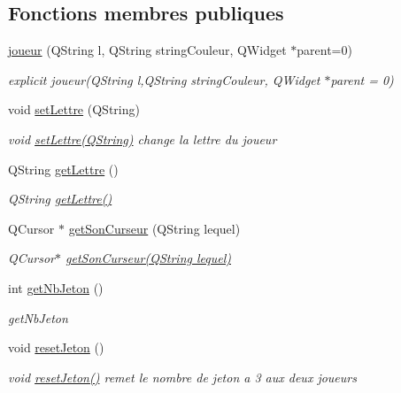 \subsection*{Fonctions membres publiques}
\begin{DoxyCompactItemize}
\item 
\hyperlink{classjoueur_a9f78a65e07011114967ef5c813a868cb}{joueur} (Q\-String l, Q\-String string\-Couleur, Q\-Widget $\ast$parent=0)
\begin{DoxyCompactList}\small\item\em explicit joueur(Q\-String l,Q\-String string\-Couleur, Q\-Widget $\ast$parent = 0) \end{DoxyCompactList}\item 
void \hyperlink{classjoueur_a6095d00e5c84a98694ae3f2ebbef48d8}{set\-Lettre} (Q\-String)
\begin{DoxyCompactList}\small\item\em void \hyperlink{classjoueur_a6095d00e5c84a98694ae3f2ebbef48d8}{set\-Lettre(\-Q\-String)}  change la lettre du joueur \end{DoxyCompactList}\item 
Q\-String \hyperlink{classjoueur_a7a91ed8fa89ad62545bae8e805565c39}{get\-Lettre} ()
\begin{DoxyCompactList}\small\item\em Q\-String \hyperlink{classjoueur_a7a91ed8fa89ad62545bae8e805565c39}{get\-Lettre()} \end{DoxyCompactList}\item 
Q\-Cursor $\ast$ \hyperlink{classjoueur_a19403939c10d9a70b6035024978ca230}{get\-Son\-Curseur} (Q\-String lequel)
\begin{DoxyCompactList}\small\item\em Q\-Cursor$\ast$ \hyperlink{classjoueur_a19403939c10d9a70b6035024978ca230}{get\-Son\-Curseur(\-Q\-String lequel)} \end{DoxyCompactList}\item 
int \hyperlink{classjoueur_a80aefa29f51995d731605b5230840ac3}{get\-Nb\-Jeton} ()
\begin{DoxyCompactList}\small\item\em get\-Nb\-Jeton \end{DoxyCompactList}\item 
void \hyperlink{classjoueur_a15c0ea5487cf6800e373cb1b1ed52b12}{reset\-Jeton} ()
\begin{DoxyCompactList}\small\item\em void \hyperlink{classjoueur_a15c0ea5487cf6800e373cb1b1ed52b12}{reset\-Jeton()}  remet le nombre de jeton a 3 aux deux joueurs \end{DoxyCompactList}\item 

\end{DoxyCompactItemize}

